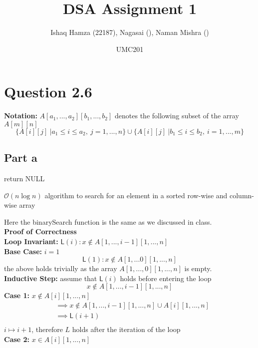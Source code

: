 \documentclass{article}
\title{DSA Assignment 1}
\author{Ishaq Hamza (22187), Nagasai (), Naman Mishra ()}
\date{UMC201}
\begin{document}
\maketitle
\section*{Question 2.6}
\textbf{Notation:} $A[a_1,..., a_2][b_1,...,b_2]$ denotes the following subset of the array $A[m][n]$
$$\{A[i][j] ~ \vert a_1 \leq i \leq a_2, ~ j = 1,...,n\} \cup \{A[i][j] ~ \vert b_1 \leq i \leq b_2, ~ i = 1,...,m\}$$
\subsection*{Part a}
\begin{algorithm}
    return NULL\;
    \caption{$\mathcal{O}(n \log n)$ algorithm to search for an element in a sorted row-wise and column-wise array}
\end{algorithm}
Here the binarySearch function is the same as we discussed in class.\\
\textbf{Proof of Correctness}\\
\textbf{Loop Invariant:} $\mathsf{L}(i): x \notin A[1,...,i-1][1,...,n]$\\
\textbf{Base Case:} $i = 1$\\
$$\mathsf{L}(1): x \notin A[1,...0][1,...,n]$$
the above holds trivially as the array $A[1,...,0][1,...,n]$ is empty.\\
\textbf{Inductive Step:} assume that $\mathsf{L}(i)$ holds before entering the loop\\
$$x \notin A[1,...,i-1][1,...,n]$$
\textbf{Case 1:} $x \notin A[i][1,...,n]$\\
    \begin{align*}
        &\implies x \notin A[1,...,i-1][1,...,n] \cup A[i][1,...,n]\\
        &\implies \mathsf{L}(i+1)\\
    \end{align*}
    $i \mapsto i+1$, therefore $L$ holds after the iteration of the loop\\
\textbf{Case 2:} $x \in A[i][1,...,n]$\\
\end{document}
